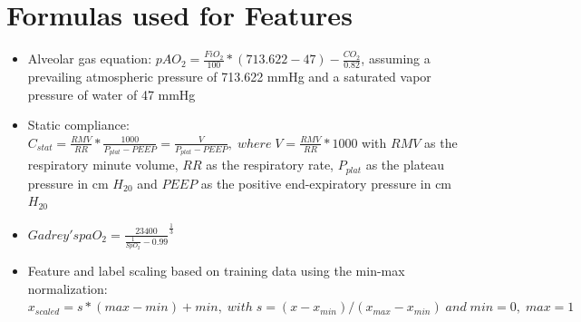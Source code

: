 \documentclass[referee,lineno,pdflatex,sn-nature]{sn-jnl}%
\theoremstyle{thmstyleone}%
\theoremstyle{thmstyletwo}%
\theoremstyle{thmstylethree}%
\begin{document}
\begin{appendices}\label{appendices}

\section{Formulas used for Features}\label{secA1}
\begin{itemize}
\item Alveolar gas equation: $pAO_2=\frac{FiO_2}{100} * (713.622 - 47) - \frac{CO_2}{0.82}$, assuming a prevailing atmospheric pressure of 713.622 mmHg and a saturated vapor pressure of water of 47 mmHg \cite{Sharma2019}
\item Static compliance: $C_{stat}=\frac{RMV}{RR}*\frac{1000}{P_{plat}-PEEP}=\frac{V}{P_{plat}-PEEP},\;where\;V=\frac{RMV}{RR}*1000$ with $RMV$ as the respiratory minute volume, $RR$ as the respiratory rate, $P_{plat}$ as the plateau pressure in cm $H_20$ and $PEEP$ as the positive end-expiratory pressure in cm $H_20$ \cite{Desai2019}
\item $Gadrey's paO_2=\frac{23400}{\frac{1}{SpO_2}-0.99}^{\frac{1}{3}}$ \cite{Gadrey2019}
\item Feature and label scaling based on training data using the min-max normalization: $x_{scaled}=s*(max-min)+min,\;with\;s=(x-x_{min})/(x_{max}-x_{min})\;and\;min=0,\;max=1$ \cite{Pedregosa2011, Han2012}
\end{itemize}


\end{appendices}
\end{document}
